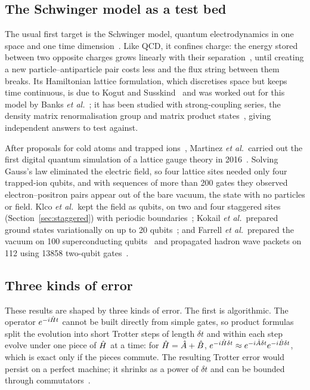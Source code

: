 \subsection{The Schwinger model as a test bed}

The usual first target is the Schwinger model, quantum electrodynamics in one
space and one time dimension~\cite{schwinger1962,coleman1976}. Like QCD, it
confines charge: the energy stored between two opposite charges grows linearly
with their separation~\cite{coleman1975}, until creating a new
particle--antiparticle pair costs less and the flux string between them breaks.
Its Hamiltonian lattice formulation, which discretises space but keeps time
continuous, is due to Kogut and Susskind~\cite{kogut1975} and was worked out
for this model by Banks \emph{et al.}~\cite{banks1976}; it has been studied with
strong-coupling series, the density matrix renormalisation group and matrix product
states~\cite{hamer1997,byrnes2002,banuls2013}, giving independent answers to
test against.

After proposals for cold atoms and trapped ions~\cite{banerjee2012,hauke2013},
Martinez \emph{et al.}\ carried out the first digital quantum simulation of a
lattice gauge theory in 2016~\cite{martinez2016}. Solving Gauss's law eliminated
the electric field, so four lattice sites needed only four trapped-ion qubits,
and with sequences of more than 200 gates they observed electron--positron pairs
appear out of the bare vacuum, the state with no particles or field. Klco \emph{et al.}\ kept
the field as qubits, on two and four staggered sites
(Section~\ref{sec:staggered}) with periodic boundaries~\cite{klco2018}; Kokail
\emph{et al.}\ prepared ground states variationally on up to 20
qubits~\cite{kokail2019}; and Farrell
\emph{et al.}\ prepared the vacuum on 100 superconducting
qubits~\cite{farrell2024} and propagated hadron wave packets on 112 using
\num{13858} two-qubit gates~\cite{farrell2024b}.

\subsection{Three kinds of error}

These results are shaped by three kinds of error. The first is algorithmic. The
operator $e^{-i\hat{H} t}$ cannot be built directly from simple gates, so product
formulas~\cite{trotter1959,suzuki1976} split the evolution into short Trotter
steps of length $\delta t$ and within each step evolve under one piece of $\hat{H}$
at a time: for $\hat{H} = \hat A + \hat B$,
$e^{-i\hat{H}\delta t} \approx e^{-i\hat A\delta t}e^{-i\hat B\delta t}$,
which is exact only if the pieces commute. The
resulting Trotter error would persist on a perfect machine; it shrinks as a
power of $\delta t$ and can be bounded through commutators~\cite{childs2021}.


